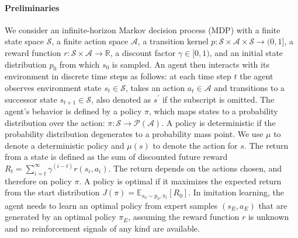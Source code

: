 \documentclass[letterpaper]{article} %
\begin{document}
\paragraph{Preliminaries}
We consider an infinite-horizon Markov decision process (MDP) with a finite state space $\mathcal{S}$, 
a finite action space $\mathcal{A}$, 
a transition kernel $p: \mathcal{S}\times\mathcal{A}\times\mathcal{S}\rightarrow (0, 1]$, 
a reward function $r: \mathcal{S}\times\mathcal{A}\rightarrow\mathbb{R}$, 
a discount factor $\gamma \in [0, 1)$, 
and an initial state distribution $p_0$ from which $s_0$ is sampled. 
An agent then interacts with its environment in discrete time steps as follows:
at each time step $t$ the agent observes environment state $s_t\in\mathcal{S}$, 
takes an action $a_t\in\mathcal{A}$ and transitions to a successor state $s_{t+1}\in\mathcal{S}$, 
also denoted as $s^\prime$ if the subscript is omitted. 
The agent's behavior is defined by a policy $\pi$, 
which maps states to a probability distribution over the action: $\pi: \mathcal{S}\rightarrow \mathcal{P}(\mathcal{A})$. 
A policy is deterministic if the probability distribution degenerates to a probability mass point.
We use $\mu$ to denote a deterministic policy and $\mu(s)$ to denote the action for $s$. 
The return from a state is defined as the sum of discounted future reward $R_t=\sum_{i=t}^{\infty}\gamma^{(i-t)}r(s_i, a_i)$.
The return depends on the actions chosen, and therefore on policy $\pi$.
A policy is optimal if it maximizes the expected return from the start distribution $J(\pi)=\mathbb{E}_{s_0\sim p_0, \pi_t}[R_0]$. 
In imitation learning, the agent needs to learn an optimal policy from expert samples $(s_E, a_E)$ that are generated by an optimal policy $\pi_E$, 
assuming the reward function $r$ is unknown and no reinforcement signals of any kind are available. 
\end{document}
